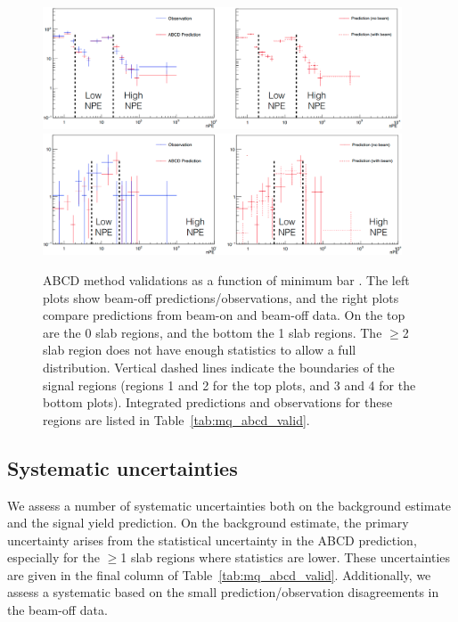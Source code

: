 {\begin{figure}[t]
  \begin{center}
    \includegraphics[width=0.95\textwidth]{figs/milliq/abcd_valid_0slab.png} \vskip2mm
    \includegraphics[width=0.95\textwidth]{figs/milliq/abcd_valid_1slab.png}
    \caption{ABCD method validations as a function of minimum bar \Npe.
      The left plots show beam-off predictions/observations, and the right
      plots compare predictions from beam-on and beam-off data.
      On the top are the 0 slab regions, and the bottom the 1 slab regions.
      The $\geq$2 slab region does not have enough statistics to allow
      a full \Npe distribution. Vertical dashed lines indicate
      the boundaries of the signal regions (regions 1 and 2 for the top plots,
      and 3 and 4 for the bottom plots). Integrated predictions and
      observations for these regions are listed in Table~\ref{tab:mq_abcd_valid}.
            }
    \label{fig:mq_abcd_valid}
  \end{center}
\end{figure}


\subsection{Systematic uncertainties}
\label{sec:mq_systs}

We assess a number of systematic uncertainties both on the background estimate and the
signal yield prediction. On the background estimate, the primary uncertainty arises
from the statistical uncertainty in the ABCD prediction, especially for the $\geq$1
slab regions where statistics are lower. These uncertainties are given
in the final column of Table~\ref{tab:mq_abcd_valid}. Additionally, we assess a systematic
based on the small prediction/observation disagreements in the beam-off data.

}
